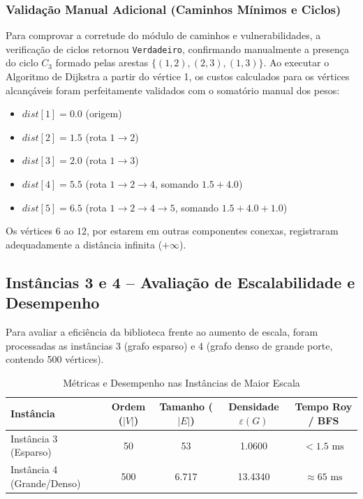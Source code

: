 \documentclass[12pt,a4paper]{article}
\begin{document}
\subsubsection*{Validação Manual Adicional (Caminhos Mínimos e Ciclos)}
Para comprovar a corretude do módulo de caminhos e vulnerabilidades, a verificação de ciclos retornou \texttt{Verdadeiro}, confirmando manualmente a presença do ciclo $C_3$ formado pelas arestas $\{(1,2), (2,3), (1,3)\}$.
Ao executar o Algoritmo de Dijkstra a partir do vértice 1, os custos calculados para os vértices alcançáveis foram perfeitamente validados com o somatório manual dos pesos:
\begin{itemize}
    \item $dist[1] = 0.0$ (origem)
    \item $dist[2] = 1.5$ (rota $1 \to 2$)
    \item $dist[3] = 2.0$ (rota $1 \to 3$)
    \item $dist[4] = 5.5$ (rota $1 \to 2 \to 4$, somando $1.5 + 4.0$)
    \item $dist[5] = 6.5$ (rota $1 \to 2 \to 4 \to 5$, somando $1.5 + 4.0 + 1.0$)
\end{itemize}
Os vértices $6$ ao $12$, por estarem em outras componentes conexas, registraram adequadamente a distância infinita ($+\infty$).

\subsection{Instâncias 3 e 4 -- Avaliação de Escalabilidade e Desempenho}
Para avaliar a eficiência da biblioteca frente ao aumento de escala, foram processadas as instâncias 3 (grafo esparso) e 4 (grafo denso de grande porte, contendo 500 vértices).

\begin{table}[H]
    \centering
    \caption{Métricas e Desempenho nas Instâncias de Maior Escala}
    \begin{tabular}{@{}lcccc@{}}
        \toprule
        \textbf{Instância} & \textbf{Ordem ($|V|$)} & \textbf{Tamanho ($|E|$)} & \textbf{Densidade $\varepsilon(G)$} & \textbf{Tempo Roy / BFS} \\ \midrule
        Instância 3 (Esparso) & 50 & 53 & 1.0600 & $< 1.5\text{ ms}$ \\
        Instância 4 (Grande/Denso) & 500 & 6.717 & 13.4340 & $\approx 65\text{ ms}$ \\ \bottomrule
    \end{tabular}
    \label{tab:desempenho}
\end{table}
\end{document}
